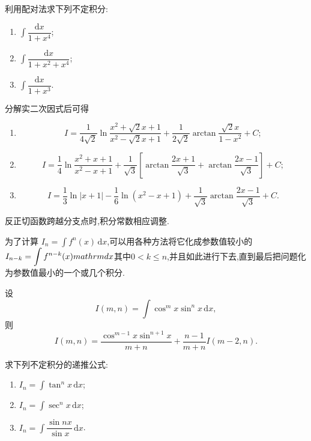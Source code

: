 \begin{example}
    利用配对法求下列不定积分:
    \begin{enumerate}
        \item $\displaystyle\int\dfrac{\mathrm{d}x}{1+x^4}$;
        \item $\displaystyle\int\dfrac{\mathrm{d}x}{1+x^2+x^4}$;
        \item $\displaystyle\int\dfrac{\mathrm{d}x}{1+x^3}$.
    \end{enumerate}
\end{example}
\exampleblank

\begin{solution}
    分解实二次因式后可得
    \begin{enumerate}
        \item
              \[
                  I=\dfrac{1}{4\sqrt2}\ln\dfrac{x^2+\sqrt2x+1}{x^2-\sqrt2x+1}
                  +\dfrac{1}{2\sqrt2}\arctan\dfrac{\sqrt2x}{1-x^2}+C;
              \]
        \item
              \[
                  I=\dfrac{1}{4}\ln\dfrac{x^2+x+1}{x^2-x+1}
                  +\dfrac{1}{\sqrt3}\left[
                      \arctan\dfrac{2x+1}{\sqrt3}
                      +\arctan\dfrac{2x-1}{\sqrt3}\right]+C;
              \]
        \item
              \[
                  I=\dfrac{1}{3}\ln|x+1|-\dfrac{1}{6}\ln(x^2-x+1)
                  +\dfrac{1}{\sqrt3}\arctan\dfrac{2x-1}{\sqrt3}+C.
              \]
    \end{enumerate}
    反正切函数跨越分支点时,积分常数相应调整.
\end{solution}




为了计算 $\displaystyle I_n=\int f^n(x)\,\mathrm{d}x$,可以用各种方法将它化成参数值较小的 $\displaystyle I_{n-k}=\int f^{n-k}(x)\\mathrm{d}x$其中$0<k\leq n$,并且如此进行下去,直到最后把问题化为参数值最小的一个或几个积分.

\begin{proposition}[\markstar]
    设
    \[
        I(m,n)=\int\cos^m x\sin^n x\,\mathrm{d}x,
    \]
    则
    \[
        I(m,n)
        =\dfrac{\cos^{m-1}x\sin^{n+1}x}{m+n}
        +\dfrac{n-1}{m+n}I(m-2,n).
    \]
\end{proposition}

\begin{example}
    求下列不定积分的递推公式:
    \begin{enumerate}
        \item $\displaystyle I_n=\int\tan^n x\,\mathrm{d}x$;
        \item $\displaystyle I_n=\int\sec^n x\,\mathrm{d}x$;
        \item $\displaystyle I_n=\int\dfrac{\sin nx}{\sin x}\,\mathrm{d}x$.
    \end{enumerate}
\end{example}
\exampleblank

